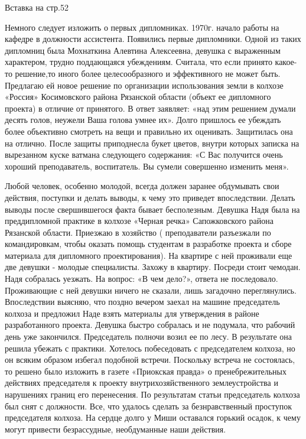 Вставка на стр.52

Немного следует изложить о первых дипломниках. 1970г. начало работы на кафедре в должности ассистента. Появились первые дипломники. Одной из таких дипломниц была Мохнаткина Алевтина Алексеевна, девушка с выраженным характером, трудно поддающаяся убеждениям. Считала, что если принято какое-то решение,то иного более целесообразного и эффективного не может быть. Предлагаю ей новое решение по организации использования земли в колхозе «Россия» Косимовского района Рязанской области (объект ее дипломного проекта)
 в отличие от принятого. В ответ заявляет: «над этим решением думали десять голов, неужели Ваша голова умнее их». Долго пришлось ее убеждать более объективно смотреть на вещи и правильно их оценивать. Защитилась она на отлично. После защиты приподнесла букет цветов, внутри которых записка на вырезанном куске ватмана следующего содержания: «С Вас получится очень хороший преподаватель, воспитатель. Вы сумели совершенно изменить меня».

Любой человек, особенно молодой, всегда должен заранее обдумывать свои действия, поступки и делать выводы, к чему это приведет впоследствии. Делать выводы после свершившегося факта бывает бесполезным. Девушка Надя была на преддипломной практике в колхозе «Черная речка» Сапожковского района Рязанской области. Приезжаю в хозяйство ( преподаватели разъезжали по командировкам, чтобы оказать помощь студентам в разработке проекта и сборе материала для дипломного проектирования). На квартире с ней проживали еще две девушки - молодые специалисты. Захожу в квартиру. Посреди стоит чемодан. Надя собралась уезжать. На вопрос: «В чем дело?», ответа не последовало. Проживающие с ней девушки ничего не сказали, лишь загадочно переглянулись. Впоследствии выясняю, что поздно вечером заехал на машине председатель колхоза и предложил Наде взять материалы для утверждения в районе разработанного проекта. Девушка быстро собралась и не подумала, что рабочий день уже закончился. Председатель полночи возил ее по лесу. В результате она решила убежать с практики. Хотелось побеседовать с председателем колхоза, но он всяким образом избегал подобной встречи. Поскольку встреча не состоялась, то решено было изложить в газете «Приокская правда» о пренебрежительных действиях председателя к проекту внутрихозяйственного землеустройства и нарушениях границ его перенесения. По результатам статьи председатель колхоза был снят с должности. Все, что удалось сделать за безнравственный проступок председателя колхоза. На сердце долго у Миши оставался горький осадок, к чему могут привести безрассудные, необдуманные наши действия.

